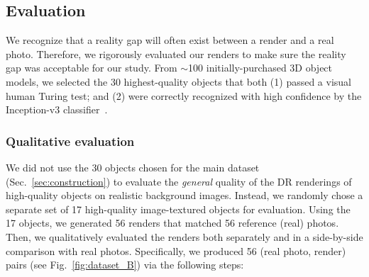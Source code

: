 \documentclass[10pt,twocolumn,letterpaper]{article}
\newcommand{\subsec}[1]{\noindent{\textbf{#1.}}}
\begin{document}
\subsection{Evaluation}
\label{sec:evaluation}

We recognize that a reality gap will often exist between a render and a real photo.
Therefore, we rigorously evaluated our renders to make sure the reality gap was acceptable for our study.
From $\sim$100 initially-purchased 3D object models, we selected the 30 highest-quality objects that both (1) passed a visual human Turing test; and (2) were correctly recognized with high confidence by the Inception-v3 classifier~\cite{szegedy2016rethinking}. 


\subsubsection{Qualitative evaluation} 
\label{sec:qualitative_eval}

We did not use the 30 objects chosen for the main dataset (Sec.~\ref{sec:construction}) to evaluate the \emph{general} quality of the DR renderings of high-quality objects on realistic background images.
Instead, we randomly chose a separate set of 17 high-quality image-textured objects for evaluation.
Using the 17 objects, we generated 56 renders that matched 56 reference (real) photos.
Then, we qualitatively evaluated the renders both separately and in a side-by-side comparison with real photos.
Specifically, we produced 56 (real photo, render) pairs (see Fig.~\ref{fig:dataset_B}) via the following steps: 

\end{document}

